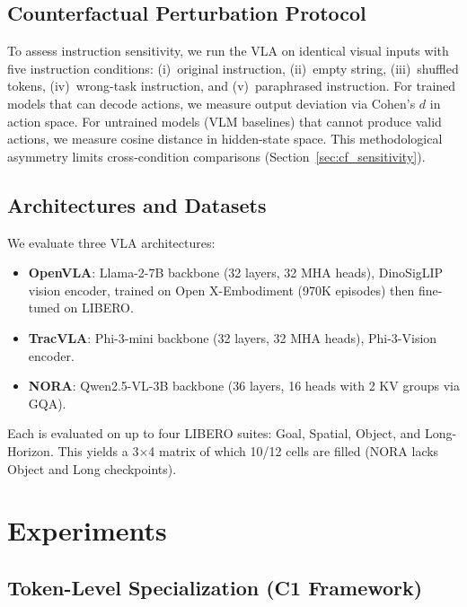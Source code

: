 \documentclass[letterpaper]{article}
\begin{document}
\subsection{Counterfactual Perturbation Protocol}

To assess instruction sensitivity, we run the VLA on identical visual inputs with five instruction conditions: (i)~original instruction, (ii)~empty string, (iii)~shuffled tokens, (iv)~wrong-task instruction, and (v)~paraphrased instruction. For trained models that can decode actions, we measure output deviation via Cohen's $d$ in action space. For untrained models (VLM baselines) that cannot produce valid actions, we measure cosine distance in hidden-state space. This methodological asymmetry limits cross-condition comparisons (Section~\ref{sec:cf_sensitivity}).

\subsection{Architectures and Datasets}

We evaluate three VLA architectures:
\begin{itemize}[nosep]
    \item \textbf{OpenVLA}: Llama-2-7B backbone (32 layers, 32 MHA heads), DinoSigLIP vision encoder, trained on Open X-Embodiment (970K episodes) then fine-tuned on LIBERO.
    \item \textbf{TracVLA}: Phi-3-mini backbone (32 layers, 32 MHA heads), Phi-3-Vision encoder.
    \item \textbf{NORA}: Qwen2.5-VL-3B backbone (36 layers, 16 heads with 2 KV groups via GQA).
\end{itemize}

Each is evaluated on up to four LIBERO suites: Goal, Spatial, Object, and Long-Horizon. This yields a 3$\times$4 matrix of which 10/12 cells are filled (NORA lacks Object and Long checkpoints).

\section{Experiments}

\subsection{Token-Level Specialization (C1 Framework)}
\label{sec:token_specialization}
\end{document}
